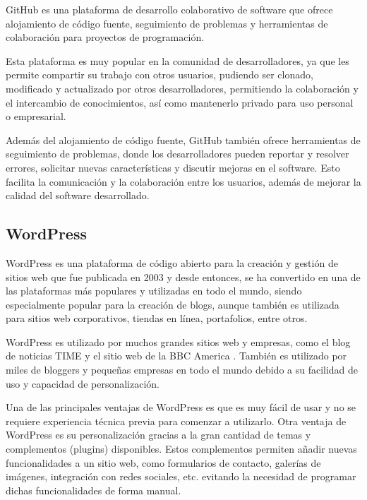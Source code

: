             GitHub \cite{github} es una plataforma de desarrollo colaborativo de software que ofrece alojamiento de código fuente, seguimiento de problemas y herramientas de colaboración para proyectos de programación.
            
            Esta plataforma es muy popular en la comunidad de desarrolladores, ya que les permite compartir su trabajo con otros usuarios, pudiendo ser clonado, modificado y actualizado por otros desarrolladores, permitiendo la colaboración y el intercambio de conocimientos, así como mantenerlo privado para uso personal o empresarial.
            
            Además del alojamiento de código fuente, GitHub también ofrece herramientas de seguimiento de problemas, donde los desarrolladores pueden reportar y resolver errores, solicitar nuevas características y discutir mejoras en el software. Esto facilita la comunicación y la colaboración entre los usuarios, además de mejorar la calidad del software desarrollado.
            
        \subsection{WordPress}
            
            WordPress \cite{wordpress} es una plataforma de código abierto para la creación y gestión de sitios web que fue publicada en 2003 y desde entonces, se ha convertido en una de las plataformas más populares y utilizadas en todo el mundo, siendo especialmente popular para la creación de blogs, aunque también es utilizada para sitios web corporativos, tiendas en línea, portafolios, entre otros. 
            
            WordPress es utilizado por muchos grandes sitios web y empresas, como el blog de noticias TIME \cite{time-web} y el sitio web de la BBC America \cite{bbc-america-web}. También es utilizado por miles de bloggers y pequeñas empresas en todo el mundo debido a su facilidad de uso y capacidad de personalización.

            Una de las principales ventajas de WordPress es que es muy fácil de usar y no se requiere experiencia técnica previa para comenzar a utilizarlo. Otra ventaja de WordPress es su personalización gracias a la gran cantidad de temas y complementos (plugins) disponibles. Estos complementos permiten añadir nuevas funcionalidades a un sitio web, como formularios de contacto, galerías de imágenes, integración con redes sociales, etc. evitando la necesidad de programar dichas funcionalidades de forma manual.
            
